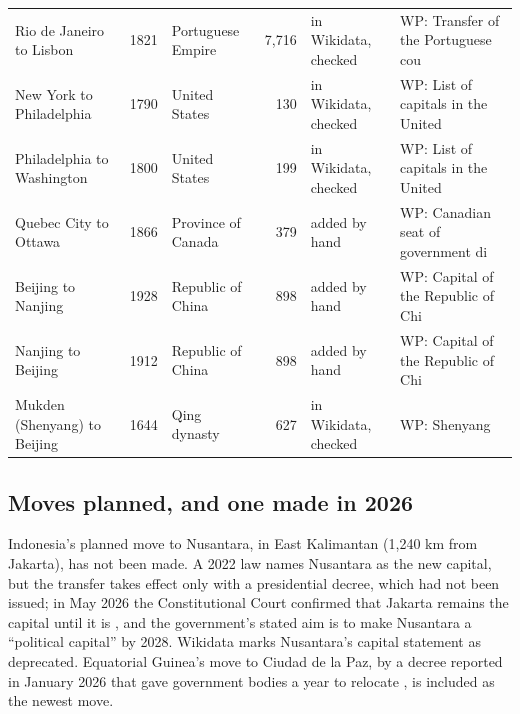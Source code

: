\documentclass[11pt,a4paper]{article}
\begin{document}
\begin{table}[tbp]
\begin{tabular}{>{\raggedright\arraybackslash}p{3.6cm}l>{\raggedright\arraybackslash}p{3.2cm}r>{\raggedright\arraybackslash}p{2.2cm}>{\raggedright\arraybackslash}p{3.6cm}}
Rio de Janeiro to Lisbon & 1821 & Portuguese Empire & 7,716 & in Wikidata, checked & WP: Transfer of the Portuguese cou\\
New York to Philadelphia & 1790 & United States & 130 & in Wikidata, checked & WP: List of capitals in the United\\
Philadelphia to Washington & 1800 & United States & 199 & in Wikidata, checked & WP: List of capitals in the United\\
Quebec City to Ottawa & 1866 & Province of Canada & 379 & added by hand & WP: Canadian seat of government di\\
Beijing to Nanjing & 1928 & Republic of China & 898 & added by hand & WP: Capital of the Republic of Chi\\
Nanjing to Beijing & 1912 & Republic of China & 898 & added by hand & WP: Capital of the Republic of Chi\\
Mukden (Shenyang) to Beijing & 1644 & Qing dynasty & 627 & in Wikidata, checked & WP: Shenyang\\
\bottomrule\end{tabular}\end{table}

\subsection{Moves planned, and one made in 2026}
Indonesia's planned move to Nusantara, in East Kalimantan (1,240 km from Jakarta), has not been made. A 2022 law names Nusantara as the new capital, but the transfer takes effect only with a presidential decree, which had not been issued; in May 2026 the Constitutional Court confirmed that Jakarta remains the capital until it is \citep{star,jakpost}, and the government's stated aim is to make Nusantara a ``political capital'' by 2028. Wikidata marks Nusantara's capital statement as deprecated. Equatorial Guinea's move to Ciudad de la Paz, by a decree reported in January 2026 that gave government bodies a year to relocate \citep{africanews}, is included as the newest move.
\end{document}

